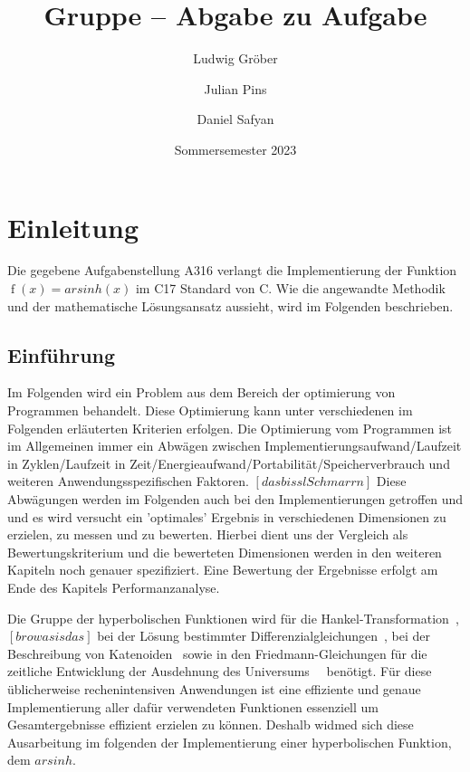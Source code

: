 \documentclass[course=erap] {aspdoc}
\author{Ludwig Gröber \and Julian Pins \and Daniel Safyan}
\date{Sommersemester 2023} %
\title{Gruppe \theGroup{} -- Abgabe zu Aufgabe \theNumber}
\begin{document}
    \maketitle


    \section{Einleitung}
    Die gegebene Aufgabenstellung A316 verlangt die Implementierung der Funktion $\operatorname{f}(x) = arsinh(x)$ im C17 Standard von C.
    Wie die angewandte Methodik und der mathematische Lösungsansatz aussieht, wird im Folgenden beschrieben.

    \subsection{Einführung}
    Im Folgenden wird ein Problem aus dem Bereich der optimierung von Programmen behandelt.
    Diese Optimierung kann unter verschiedenen im Folgenden erläuterten Kriterien erfolgen.
    Die Optimierung vom Programmen ist im Allgemeinen immer ein Abwägen zwischen Implementierungsaufwand/Laufzeit in Zyklen/Laufzeit in Zeit/Energieaufwand/Portabilität/Speicherverbrauch und weiteren Anwendungsspezifischen Faktoren. $[das bissl Schmarrn]$
    Diese Abwägungen werden im Folgenden auch bei den Implementierungen getroffen und und es wird versucht ein 'optimales' Ergebnis in verschiedenen Dimensionen zu erzielen, zu messen und zu bewerten.
    Hierbei dient uns der Vergleich als Bewertungskriterium und die bewerteten Dimensionen werden in den weiteren Kapiteln noch genauer spezifiziert.
    Eine Bewertung der Ergebnisse erfolgt am Ende des Kapitels Performanzanalyse.

    Die Gruppe der hyperbolischen Funktionen wird für die Hankel-Transformation~\cite{hankel}, $[bro wasis das]$
    bei der Lösung bestimmter Differenzialgleichungen~\cite{differenzial}, bei der Beschreibung von Katenoiden~\cite{katenoid}
    sowie in den Friedmann-Gleichungen für die zeitliche Entwicklung der Ausdehnung des Universums~\cite{universum1,universum2}~ benötigt. 
    Für diese üblicherweise rechenintensiven Anwendungen ist eine effiziente und genaue Implementierung aller dafür verwendeten Funktionen essenziell um Gesamtergebnisse effizient erzielen zu können.
    Deshalb widmed sich diese Ausarbeitung im folgenden der Implementierung einer hyperbolischen Funktion, dem $arsinh$.
\end{document}
